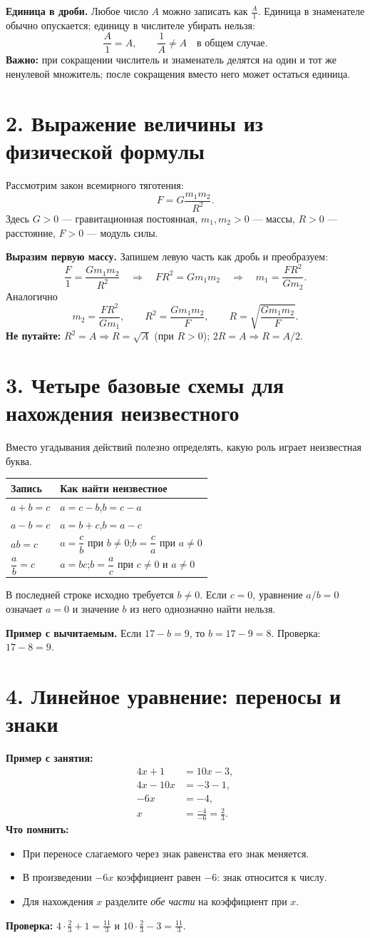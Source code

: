 \documentclass[a4paper,12pt]{article}
\newcommand{\lead}[1]{\textcolor{darkaccent}{\textbf{#1}}}
\newcommand{\beware}[1]{\textcolor{warn}{\textbf{#1}}}
\newcommand{\sect}[1]{\section*{#1}\vspace{-3mm}}
\begin{document}
\lead{Единица в дроби.} Любое число $A$ можно записать как $\displaystyle\frac{A}{1}$. Единица в знаменателе обычно опускается; единицу в числителе убирать нельзя:
\[
\frac{A}{1}=A,\qquad \frac{1}{A}\ne A\quad\text{в общем случае}.
\]
\beware{Важно:} при сокращении числитель и знаменатель делятся на один и тот же ненулевой множитель; после сокращения вместо него может остаться единица.

\sect{2. Выражение величины из физической формулы}
Рассмотрим закон всемирного тяготения:
\[
F=G\frac{m_1m_2}{R^2}.
\]
Здесь $G>0$ --- гравитационная постоянная, $m_1,m_2>0$ --- массы, $R>0$ --- расстояние, $F>0$ --- модуль силы.

\textbf{Выразим первую массу.} Запишем левую часть как дробь и преобразуем:
\[
\frac{F}{1}=\frac{Gm_1m_2}{R^2}
\quad\Longrightarrow\quad FR^2=Gm_1m_2
\quad\Longrightarrow\quad
\boxed{m_1=\frac{FR^2}{Gm_2}}.
\]
Аналогично
\[
\boxed{m_2=\frac{FR^2}{Gm_1}},\qquad
\boxed{R^2=\frac{Gm_1m_2}{F}},\qquad
\boxed{R=\sqrt{\frac{Gm_1m_2}{F}}}.
\]
\beware{Не путайте:} $R^2=A\Rightarrow R=\sqrt A$ (при $R>0$); $2R=A\Rightarrow R=A/2$.

\sect{3. Четыре базовые схемы для нахождения неизвестного}
Вместо угадывания действий полезно определять, какую роль играет неизвестная буква.
\begin{center}
\renewcommand{\arraystretch}{1.7}
\begin{tabularx}{\linewidth}{@{}>{\raggedright\arraybackslash}p{32mm}X@{}}
\toprule
\textbf{Запись} & \textbf{Как найти неизвестное}\\
\midrule
$a+b=c$ & $a=c-b$,\quad $b=c-a$\\
$a-b=c$ & $a=b+c$,\quad $b=a-c$\\
$ab=c$ & $a=\dfrac cb$ при $b\ne0$;\quad $b=\dfrac ca$ при $a\ne0$\\
$\dfrac ab=c$ & $a=bc$;\quad $b=\dfrac ac$ при $c\ne0$ и $a\ne0$\\
\bottomrule
\end{tabularx}
\end{center}
В последней строке исходно требуется $b\ne0$. Если $c=0$, уравнение $a/b=0$ означает $a=0$ и значение $b$ из него однозначно найти нельзя.

\textbf{Пример с вычитаемым.} Если $17-b=9$, то $b=17-9=8$.
Проверка: $17-8=9$.

\sect{4. Линейное уравнение: переносы и знаки}
\textbf{Пример с занятия:}
\[
\begin{aligned}
4x+1&=10x-3,\\
4x-10x&=-3-1,\\
-6x&=-4,\\
x&=\frac{-4}{-6}=\boxed{\frac23}.
\end{aligned}
\]
\lead{Что помнить:}
\begin{itemize}
\item При переносе слагаемого через знак равенства его знак меняется.
\item В произведении $-6x$ коэффициент равен $-6$: знак относится к числу.
\item Для нахождения $x$ разделите \emph{обе части} на коэффициент при $x$.
\end{itemize}
\textbf{Проверка:} $4\cdot\frac23+1=\frac{11}{3}$ и $10\cdot\frac23-3=\frac{11}{3}$.
\end{document}
